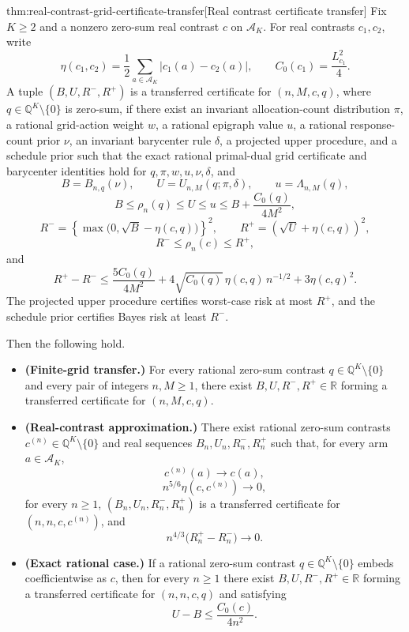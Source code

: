\begin{theoremv}{thm:real-contrast-grid-certificate-transfer}[Real contrast certificate transfer]
Fix \(K\ge 2\) and a nonzero zero-sum real contrast \(c\) on \(\mathcal A_K\).  For real contrasts \(c_1,c_2\), write
\[
\eta(c_1,c_2)=\frac12\sum_{a\in\mathcal A_K}|c_1(a)-c_2(a)|,
\qquad
C_0(c_1)=\frac{L_{c_1}^2}{4}.
\]
A tuple \((B,U,R^-,R^+)\) is a transferred certificate for \((n,M,c,q)\), where \(q\in\mathbb Q^K\setminus\{0\}\) is zero-sum, if there exist an invariant allocation-count distribution \(\pi\), a rational grid-action weight \(w\), a rational epigraph value \(u\), a rational response-count prior \(\nu\), an invariant barycenter rule \(\delta\), a projected upper procedure, and a schedule prior such that the exact rational primal-dual grid certificate and barycenter identities hold for \(q,\pi,w,u,\nu,\delta\), and
\[
B=B_{n,q}(\nu),\qquad
U=U_{n,M}(q;\pi,\delta),\qquad
u=\Lambda_{n,M}(q),
\]
\[
B\le \rho_n(q)\le U\le u
\le B+\frac{C_0(q)}{4M^2},
\]
\[
R^-=\left\{\max\bigl(0,\sqrt B-\eta(c,q)\bigr)\right\}^2,
\qquad
R^+=\left(\sqrt U+\eta(c,q)\right)^2,
\]
\[
R^-\le \rho_n(c)\le R^+,
\]
and
\[
R^+-R^-\le
\frac{5C_0(q)}{4M^2}
+4\sqrt{C_0(q)}\,\eta(c,q)\,n^{-1/2}
+3\eta(c,q)^2.
\]
The projected upper procedure certifies worst-case risk at most \(R^+\), and the schedule prior certifies Bayes risk at least \(R^-\).

Then the following hold.
\begin{itemize}
\item \textbf{(Finite-grid transfer.)} For every rational zero-sum contrast \(q\in\mathbb Q^K\setminus\{0\}\) and every pair of integers \(n,M\ge 1\), there exist \(B,U,R^-,R^+\in\mathbb R\) forming a transferred certificate for \((n,M,c,q)\).

\item \textbf{(Real-contrast approximation.)} There exist rational zero-sum contrasts \(c^{(n)}\in\mathbb Q^K\setminus\{0\}\) and real sequences \(B_n,U_n,R_n^-,R_n^+\) such that, for every arm \(a\in\mathcal A_K\),
\[
c^{(n)}(a)\longrightarrow c(a),
\]
\[
n^{5/6}\eta(c,c^{(n)})\longrightarrow 0,
\]
for every \(n\ge 1\), \((B_n,U_n,R_n^-,R_n^+)\) is a transferred certificate for \((n,n,c,c^{(n)})\), and
\[
n^{4/3}\bigl(R_n^+-R_n^-\bigr)\longrightarrow 0.
\]

\item \textbf{(Exact rational case.)} If a rational zero-sum contrast \(q\in\mathbb Q^K\setminus\{0\}\) embeds coefficientwise as \(c\), then for every \(n\ge 1\) there exist \(B,U,R^-,R^+\in\mathbb R\) forming a transferred certificate for \((n,n,c,q)\) and satisfying
\[
U-B\le \frac{C_0(c)}{4n^2}.
\]
\end{itemize}
\end{theoremv}

